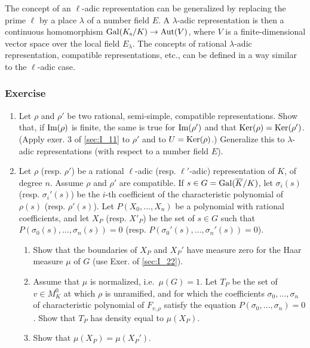 \begin{obs}
The concept of an $\ell$-adic representation can be generalized by replacing
the prime $\ell$ by a place $\lambda$ of a number field  $E$. A $\lambda$-adic
representation is then a continuous homomorphism $\operatorname{Gal}(K_{\mathrm{s}}/K) \to
\operatorname{Aut}(V)$, where $V$ is a finite-dimensional vector space over the local field
$E_\lambda$. The concepts of rational $\lambda$-adic representation, compatible
representations, etc., can be defined in a way similar to the $\ell$-adic case.
\end{obs}

\subsubsection*{Exercise}
\begin{enumerate}
	\item Let $\rho$ and $\rho'$ be two rational, semi-simple, compatible representations. Show that, if $\operatorname{Im}(\rho)$ is finite, the same is true for $\operatorname{Im}(\rho')$ and that $\operatorname{Ker}(\rho) = \operatorname{Ker}(\rho')$. (Apply exer. 3 of \ref{sec:I_11} to $\rho'$ and to $U = \operatorname{Ker}(\rho)$.) Generalize this to $\lambda$-adic representations (with respect to a number field $E$).
	\item Let $\rho$ (resp. $\rho'$) be a rational $\ell$-adic (resp. $\ell'$-adic) representation of $K$, of degree $n$. Assume $\rho$ and $\rho'$ are compatible. If $s \in G = \operatorname{Gal}(\overline{K}/K)$, let $\sigma_i(s)$ (resp. $\sigma_i'(s)$) be the
\dpage 
	$i$-th coefficient of the characteristic polynomial of $\rho(s)$ (resp. $\rho'(s)$). Let $P(X_0,\hdots,X_n)$ be a polynomial with rational coefficients, and let $X_P$ (resp. $X'_P$) be the set of $s \in G$ such that $P(\sigma_0(s),\hdots,\sigma_n(s)) = 0$ (resp. $P(\sigma_0'(s),\hdots,\sigma_n'(s)) = 0$).
	\begin{enumerate}
		\item Show that the boundaries of $X_P$ and $X_P'$ have measure zero for the Haar measure $\mu$ of $G$ (use Exer. of \ref{sec:I_22}).
		\item Assume that $\mu$ is normalized, i.e.\ $\mu(G) = 1$. Let $T_P$ be the set of $v \in M_K^0$ at which $\rho$ is unramified, and for which the coefficients $\sigma_0,\hdots,\sigma_n$ of characteristic polynomial of $F_{v,\rho}$ satisfy the equation $P(\sigma_0,\hdots,\sigma_n) = 0$. Show that $T_P$ has density equal to $\mu(X_P)$.
		\item Show that $\mu(X_P) = \mu(X_P')$.
	\end{enumerate}
\end{enumerate}

